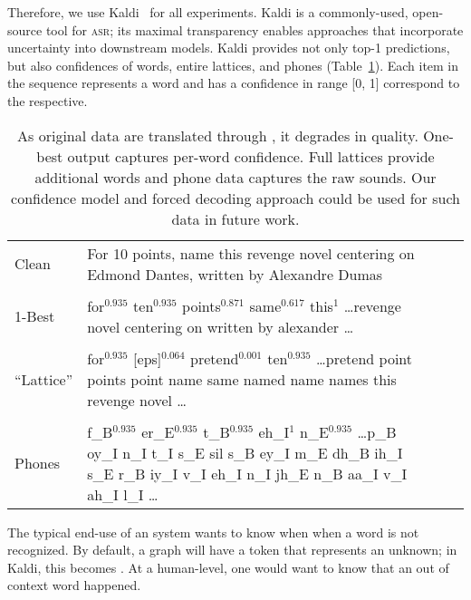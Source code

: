 Therefore, we use Kaldi~\citep{Povey11thekaldi} for all experiments.  Kaldi is a commonly-used, open-source tool for
 \textsc{asr}; its maximal transparency enables approaches that incorporate uncertainty into
downstream models.  Kaldi provides not only top-1
predictions, but also confidences of words, entire lattices, and phones
(Table~\ref{tab:data}).  
%
Each item in the sequence represents a word and has a confidence in range [0, 1] correspond to the respective.

\begin{table}[t!]
	\small
	\begin{tabularx}{\textwidth}{lXXr}
		\\[-1em]
				Clean  & For 10 points, name this revenge novel centering on Edmond Dantes, written by Alexandre Dumas  \\ 
		\rowcolor{gray!25}
		\\[-1em]
			\rowcolor{gray!25}
		1-Best& for$^{0.935}$ ten$^{0.935}$ points$^{0.871}$ same$^{0.617}$ this$^{1}$ \ldots revenge novel centering on \unk{} written by alexander \unk{} \dots \\
		\rowcolor{white}
		\\[-1em]
		``Lattice''& for$^{0.935}$ [eps]$^{0.064}$ pretend$^{0.001}$ ten$^{0.935}$  \dots \mbox{pretend}   point points  point   name same named name names this revenge novel \ldots \\
		\rowcolor{gray!25}
		\\[-1em]
			\rowcolor{gray!25}
		Phones  & f\_B$^{0.935}$ er\_E$^{0.935}$  t\_B$^{0.935}$  eh\_I$^{1}$  n\_E$^{0.935}$ \ldots p\_B   oy\_I n\_I t\_I s\_E sil s\_B ey\_I m\_E dh\_B ih\_I s\_E r\_B iy\_I v\_I eh\_I n\_I jh\_E n\_B aa\_I v\_I ah\_I l\_I \ldots \\
		
	\end{tabularx}
	\caption{As original data are translated through , it
	degrades in quality.  One-best output captures per-word
	confidence.  Full lattices provide additional words and phone data captures the raw  sounds.  Our confidence model and forced decoding approach could be used for such data in future work.}
	\label{tab:data}

\end{table}

	
The typical end-use of an \asr{} system wants to know when when a word is not recognized.  
By default, a graph will have a token that represents an unknown; in Kaldi, this becomes \unk{}.
At a human-level, one would want to know that an out of context word happened.

